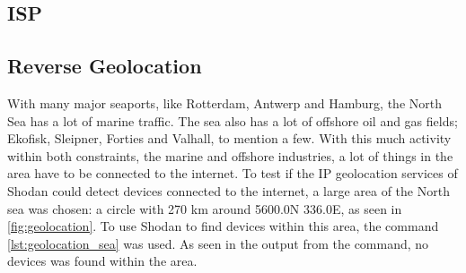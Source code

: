 \subsection{ISP}

\subsection{Reverse Geolocation}

With many major seaports, like Rotterdam, Antwerp and Hamburg, the North Sea has a lot of marine traffic. The sea also has a lot of offshore oil and gas fields; Ekofisk, Sleipner, Forties and Valhall, to mention a few.\cite{oil_field_lists} With this much activity within both constraints, the marine and offshore industries, a lot of things in the area have to be connected to the internet. To test if the IP geolocation services of Shodan could detect devices connected to the internet, a large area of the North sea was chosen: a circle with 270 km around 56\textquotesingle00.0N 3\textquotesingle36.0E, as seen in \cref{fig:geolocation}. To use Shodan to find devices within this area, the command \cref{lst:geolocation_sea} was used. As seen in the output from the command, no devices was found within the area.

